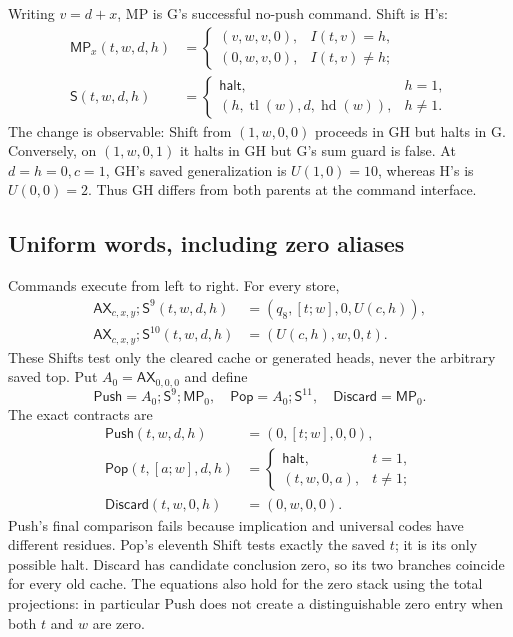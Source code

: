 Writing $v=d+x$, MP is G's successful no-push command. Shift is H's:
\begin{align*}
 \mathsf{MP}_x(t,w,d,h)&=
 \begin{cases}(v,w,v,0),&I(t,v)=h,\\(0,w,v,0),&I(t,v)\ne h;\end{cases}\\
 \mathsf S(t,w,d,h)&=
 \begin{cases}\mathsf{halt},&h=1,\\
 (h,\operatorname{tl}(w),d,\operatorname{hd}(w)),&h\ne1.
 \end{cases}
\end{align*}
The change is observable: Shift from $(1,w,0,0)$ proceeds in GH but halts
in G. Conversely, on $(1,w,0,1)$ it halts in GH but G's sum guard is false.
At $d=h=0,c=1$, GH's saved generalization is $U(1,0)=10$, whereas H's is
$U(0,0)=2$. Thus GH differs from both parents at the command interface.

\subsection{Uniform words, including zero aliases}

Commands execute from left to right. For every store,
\begin{align*}
 \mathsf{AX}_{c,x,y};\mathsf S^9(t,w,d,h)
     &=(q_8,[t;w],0,U(c,h)),\\
 \mathsf{AX}_{c,x,y};\mathsf S^{10}(t,w,d,h)
     &=(U(c,h),w,0,t).
\end{align*}
These Shifts test only the cleared cache or generated heads, never the
arbitrary saved top. Put $A_0=\mathsf{AX}_{0,0,0}$ and define
\[
 \mathsf{Push}=A_0;\mathsf S^9;\mathsf{MP}_0,
 \quad \mathsf{Pop}=A_0;\mathsf S^{11},
 \quad \mathsf{Discard}=\mathsf{MP}_0.
\]
The exact contracts are
\begin{align*}
 \mathsf{Push}(t,w,d,h)&=(0,[t;w],0,0),\\
 \mathsf{Pop}(t,[a;w],d,h)&=
 \begin{cases}\mathsf{halt},&t=1,\\(t,w,0,a),&t\ne1;\end{cases}\\
 \mathsf{Discard}(t,w,0,h)&=(0,w,0,0).
\end{align*}
Push's final comparison fails because implication and universal codes have
different residues. Pop's eleventh Shift tests exactly the saved $t$; it
is its only possible halt. Discard has candidate conclusion zero, so its
two branches coincide for every old cache. The equations also hold for
the zero stack using the total projections: in particular Push does not
create a distinguishable zero entry when both $t$ and $w$ are zero.

